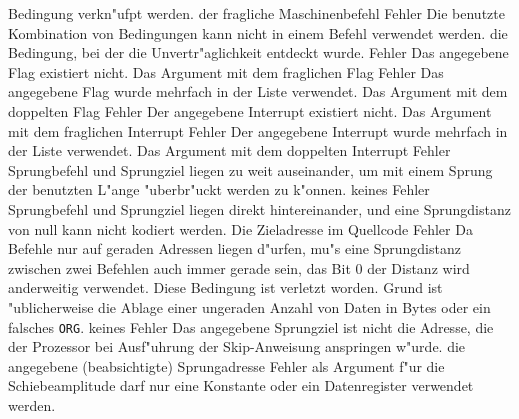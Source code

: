 \documentclass[12pt,a4paper,twoside]{report}
\newcommand{\tty}[1]{{\tt #1}}
\begin{document}
\begin{description}
{                Bedingung verkn"ufpt werden.}
               {der fragliche Maschinenbefehl}
               {Fehler}
               {Die benutzte Kombination von Bedingungen kann nicht
                in einem Befehl verwendet werden.}
               {die Bedingung, bei der die Unvertr"aglichkeit
                entdeckt wurde.}
               {Fehler}
               {Das angegebene Flag existiert nicht.}
               {Das Argument mit dem fraglichen Flag}
               {Fehler}
               {Das angegebene Flag wurde mehrfach in der Liste verwendet.}
               {Das Argument mit dem doppelten Flag}
               {Fehler}
               {Der angegebene Interrupt existiert nicht.}
               {Das Argument mit dem fraglichen Interrupt}
               {Fehler}
               {Der angegebene Interrupt wurde mehrfach in der Liste verwendet.}
               {Das Argument mit dem doppelten Interrupt}
               {Fehler}
               {Sprungbefehl und Sprungziel liegen zu weit
                auseinander, um mit einem Sprung der benutzten L"ange
                "uberbr"uckt werden zu k"onnen.}
               {keines}
               {Fehler}
               {Sprungbefehl und Sprungziel liegen direkt hintereinander,
                und eine Sprungdistanz von null kann nicht kodiert werden.}
               {Die Zieladresse im Quellcode}
               {Fehler}
               {Da Befehle nur auf geraden Adressen liegen
                d"urfen, mu"s eine Sprungdistanz zwischen zwei Befehlen
                auch immer gerade sein, das Bit 0 der Distanz wird
                anderweitig verwendet.  Diese Bedingung ist verletzt
                worden.  Grund ist "ublicherweise die Ablage einer
                ungeraden Anzahl von Daten in Bytes oder ein falsches \tty{ORG}.}
               {keines}
               {Fehler}
               {Das angegebene Sprungziel ist nicht die Adresse, die der
                Prozessor bei Ausf"uhrung der Skip-Anweisung anspringen w"urde.}
               {die angegebene (beabsichtigte) Sprungadresse}
               {Fehler}
               {als Argument f"ur die Schiebeamplitude darf nur
                eine Konstante oder ein Datenregister verwendet werden.
}
\end{description}
\end{document}
